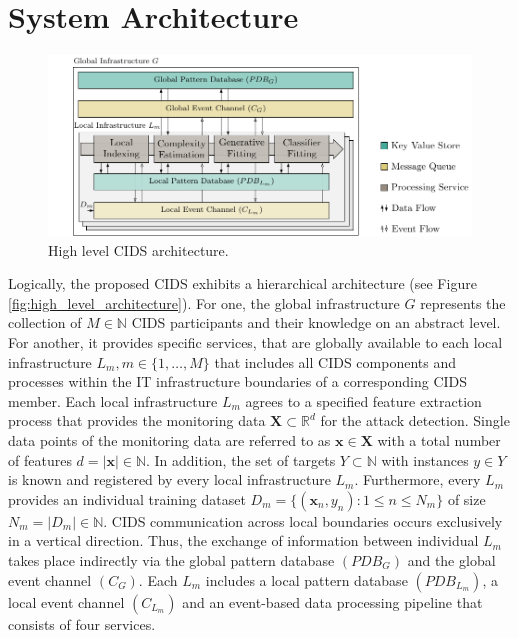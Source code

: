 \section{System Architecture} \label{sec:system_architecture}



\begin{figure}[b!]
    \centering
    \includegraphics[width=1\linewidth]{tikz/detailed_architecture.pdf}
    \caption{High level CIDS architecture.}
    \label{fig:detailed_architecture}
    \end{figure}

    
    Logically, the proposed CIDS exhibits a hierarchical architecture (see Figure \ref{fig:high_level_architecture}). For one, the global infrastructure $G$ represents the collection of $M \in \mathbb{N}$ CIDS participants and their knowledge on an abstract level. For another, it provides specific services, that are globally available to each local infrastructure $L_m, m \in \{1, \dots, M\}$ that includes all CIDS components and processes within the IT infrastructure boundaries of a corresponding CIDS member. Each local infrastructure $L_m$ agrees to a specified feature extraction process that provides the monitoring data $\bm{X} \subset \mathbb{R}^d$ for the attack detection. Single data points of the monitoring data are referred to as $\bm{x} \in \bm{X}$ with a total number of features $d = |\bm{x}| \in \mathbb{N}$. In addition, the set of targets $Y \subset \mathbb{N}$ with instances $y \in Y$ is known and registered by every local infrastructure $L_m$. Furthermore, every $L_m$ provides an individual training dataset $D_m= \{(\bm{x}_n, y_n): 1 \leq n \leq N_m\}$ of size $N_m = |D_m| \in \mathbb{N}$. CIDS communication across local boundaries occurs exclusively in a vertical direction. Thus, the exchange of information between individual $L_m$ takes place indirectly via the global pattern database $(PDB_G)$ and the global event channel $(C_G)$. Each $L_m$ includes a local pattern database $(PDB_{L_m})$, a local event channel $(C_{L_m})$ and an event-based data processing pipeline that consists of four services.

